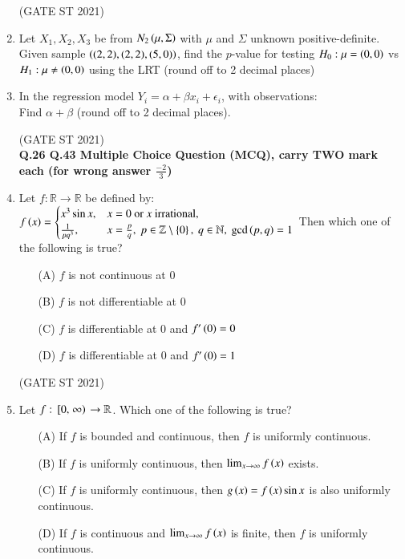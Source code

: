 \documentclass[journal,12pt,onecolumn]{IEEEtran}
\theoremstyle{remark}
\begin{document}
\begin{enumerate}
\hfill (GATE ST 2021) \\

\item
Let $X_1, X_2, X_3$ be from $N_2\left(\mu, \Sigma\right)$ with $\mu$ and $\Sigma$ unknown positive-definite.  
Given sample $\left((2,2), (2,2), (5,0)\right)$, find the $p$-value for testing $H_0: \mu = \left(0,0\right)$ vs $H_1: \mu \neq \left(0,0\right)$ using the LRT (round off to 2 decimal places)

\item
In the regression model $Y_i = \alpha + \beta x_i + \epsilon_i$,  
with observations: \\
 
\bigskip
Find $\alpha + \beta$ (round off to 2 decimal places).

\hfill (GATE ST 2021) \\

\textbf{Q.26 \text{-} Q.43 Multiple Choice Question (MCQ), carry TWO mark each (for wrong answer $\frac{-2}{3}$)}
\item
Let $f: \mathbb{R} \to \mathbb{R}$ be defined by:
$
f\left(x\right) =
\begin{cases}
x^3 \sin x, & x = 0 \ \text{or $x$ irrational}, \\
\frac{1}{p q^3}, & x = \frac{p}{q}, \ p \in \mathbb{Z} \setminus \left\{0\right\}, \ q \in \mathbb{N}, \ \gcd\left(p,q\right) = 1
\end{cases}
$
Then which one of the following is true?
\begin{enumerate}
\item[(A)] $f$ is not continuous at $0$
\item[(B)] $f$ is not differentiable at $0$
\item[(C)] $f$ is differentiable at $0$ and $f'\left(0\right) = 0$
\item[(D)] $f$ is differentiable at $0$ and $f'\left(0\right) = 1$
\end{enumerate}

\hfill (GATE ST 2021) \\

\item
Let $f: {}\left[0, \left.\infty\right)\right. \to \mathbb{R}$. Which one of the following is true?
\begin{enumerate}
\item[(A)] If $f$ is bounded and continuous, then $f$ is uniformly continuous.
\item[(B)] If $f$ is uniformly continuous, then $\lim_{x \to \infty} f\left(x\right)$ exists.
\item[(C)] If $f$ is uniformly continuous, then $g\left(x\right) = f\left(x\right) \sin x$ is also uniformly continuous.
\item[(D)] If $f$ is continuous and $\lim_{x \to \infty} f\left(x\right)$ is finite, then $f$ is uniformly continuous.
\end{enumerate}


\end{enumerate}
\end{document}
